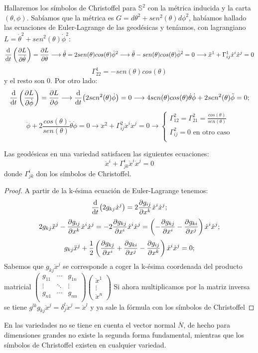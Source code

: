 \documentclass[palatino, bibnumbers]{apuntes}
\begin{document}
\begin{example} Hallaremos los símbolos de Christoffel para $\mathbb{S}^2$ con la métrica inducida y la carta $(\theta,\phi)$.
Sabíamos que la métrica es $G=d\theta^2+sen^2(\theta)d\phi^2$, habíamos hallado las ecuaciones de Euler-Lagrange de las geodésicas y teníamos, con lagrangiano $L=\dot{\theta}^2+sen^2(\theta)\dot{\phi}^2$: $$\dv{t}\left(\pdv{L}{\dot{\theta}}\right)=\pdv{L}{\theta}\longrightarrow\ddot{\theta}=2sen(\theta)cos(\theta)\dot{\phi}^2\longrightarrow\ddot{\theta}-sen(\theta)cos(\theta)\dot{\phi}^2=0\longrightarrow\ddot{x}^1+\Gamma^1_{ij}\dot{x}^i\dot{x}^j=0$$
$$\Gamma^1_{22}=-sen(\theta)cos(\theta)$$ y el resto son 0. Por otro lado:
$$\dv{t}\left(\pdv{L}{\dot{\phi}}\right)=\pdv{L}{\phi}\longrightarrow\dv{t}(2sen^2(\theta)\dot{\phi})=0\longrightarrow4sen(\theta)cos(\theta)\dot{\theta}\dot{\phi}+2sen^2(\theta)\ddot{\phi}=0;$$
$$\ddot{\phi}+2\frac{cos(\theta)}{sen(\theta)}\dot{\theta}\dot{\phi}=0\longrightarrow\ddot{x}^2+\Gamma^2_{ij}\dot{x}^i\dot{x}^j=0\longrightarrow\begin{cases}
\Gamma^2_{12}=\Gamma^2_{21}=\frac{cos(\theta)}{sen(\theta)}\\
\Gamma^2_{ij}=0 \text{ en otro caso}\\
\end{cases}$$
\end{example}
\begin{prop}Las geodésicas en una variedad satisfacen las siguientes ecuaciones:
\begin{equation}
\ddot{x}^i+\Gamma^i_{jk}\dot{x}^i\dot{x}^j=0
\end{equation}
donde $\Gamma^i_{jk}$ don los símbolos de Christoffel.
\end{prop}
\begin{proof} A partir de la k-ésima ecuación de Euler-Lagrange tenemos: $$\dv{t}(2g_{kj}\dot{x}^j)=2\pdv{g_{ij}}{x^k}\dot{x}^i\dot{x}^j;$$
	$$2g_{kj}\ddot{x}^j-\pdv{g_{ij}}{x^k}\dot{x}^i\dot{x}^j=-2\pdv{g_{kj}}{x^i}\dot{x}^i\dot{x}^j=\left(-\pdv{g_{kj}}{x^i}-\pdv{g_{ki}}{x^j}\right)\dot{x}^i\dot{x}^j;$$$$g_{kj}\ddot{x}^j+\frac{1}{2}\left(\pdv{g_{kj}}{x^i}+\pdv{g_{ki}}{x^j}-\pdv{g_{ij}}{x^k}\right)\dot{x}^i\dot{x}^j=0;$$
	Sabemos que $g_{kj}\ddot{x}^j$ se corresponde a coger la k-ésima coordenada del producto matricial $\begin{pmatrix}g_{11}&\cdots&g_{1n}\\\vdots&\ddots&\vdots\\g_{n1}&\cdots&g_{nn}\\\end{pmatrix}\begin{pmatrix}\ddot{x}^1\\\vdots\\\ddot{x}^n\end{pmatrix}$ Si ahora multiplicamos por la matriz inversa se tiene $g^{lk}g_{kj}\ddot{x}^j=\delta^l_j\ddot{x}^j=\ddot{x}^l$ y ya sale la fórmula con los símbolos de Christoffel
\end{proof}
En las variedades no se tiene en cuenta el vector normal $\overline{N}$, de hecho para dimensiones grandes no existe la segunda forma fundamental, mientras que los símbolos de Christoffel existen en cualquier variedad.
\end{document}
